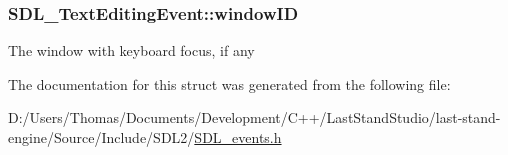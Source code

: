 \subsubsection[{window\+I\+D}]{ S\+D\+L\+\_\+\+Text\+Editing\+Event\+::window\+I\+D}\label{structSDL__TextEditingEvent_a23b3e414cf7a7ccc547b7595ca930049}
The window with keyboard focus, if any 

The documentation for this struct was generated from the following file\+:\begin{DoxyCompactItemize}
\item 
D\+:/\+Users/\+Thomas/\+Documents/\+Development/\+C++/\+Last\+Stand\+Studio/last-\/stand-\/engine/\+Source/\+Include/\+S\+D\+L2/\hyperlink{SDL__events_8h}{S\+D\+L\+\_\+events.\+h}\end{DoxyCompactItemize}
